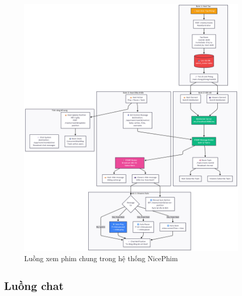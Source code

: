 \begin{figure}[H]
	\centering
	\includegraphics[width=1\textwidth]{image/mermaid/luongwatchtogether.png}
	\caption{Luồng xem phim chung trong hệ thống NicePhim}
	\label{fig:luongwatchtogether}
\end{figure}

\subsection{Luồng chat}

